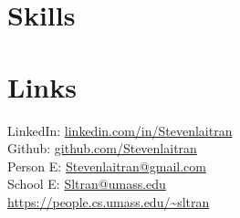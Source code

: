 \sectionsep


\section{Skills}


\sectionsep


\section{Links}
\begin{tabbing}
LinkedIn:  \hspace{.12cm} \= \href{https://www.linkedin.com/in/stevenlaitran/}{linkedin.com/in/Stevenlaitran} \\
Github:     \> \href{https://github.com/stevenlaitran}{github.com/Stevenlaitran} \\
Person E:   \> \href{mailto:stevenlaitran@gmail.com}{Stevenlaitran@gmail.com} \\
School E:   \> \href{mailto:Sltran@umass.edu}{Sltran@umass.edu} \\
\hspace{.12cm} \href{https://people.cs.umass.edu/~sltran}{https://people.cs.umass.edu/\textasciitilde{}sltran} \\
\end{tabbing}
